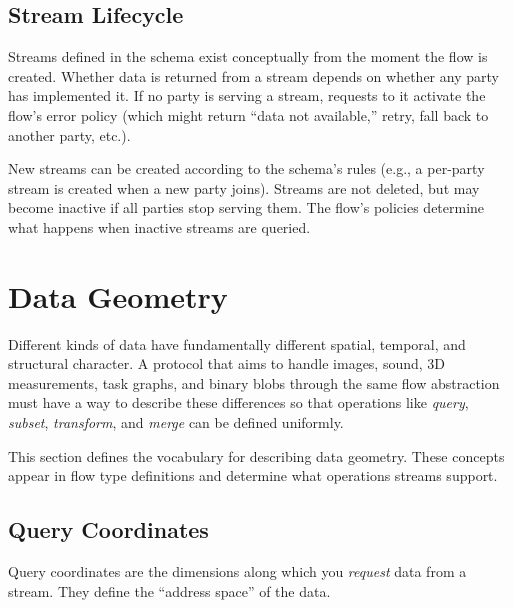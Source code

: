 \documentclass[11pt, letterpaper]{article}
\begin{document}
\subsection{Stream Lifecycle}

Streams defined in the schema exist conceptually from the moment the flow is created.
Whether data is returned from a stream depends on whether any party has implemented it.
If no party is serving a stream, requests to it activate the flow's error policy (which
might return ``data not available,'' retry, fall back to another party, etc.).

New streams can be created according to the schema's rules (e.g., a per-party stream
is created when a new party joins). Streams are not deleted, but may become inactive
if all parties stop serving them. The flow's policies determine what happens when
inactive streams are queried.


\newpage
\section{Data Geometry}
\label{sec:geometry}

Different kinds of data have fundamentally different spatial, temporal, and structural
character. A protocol that aims to handle images, sound, 3D measurements, task graphs,
and binary blobs through the same flow abstraction must have a way to describe these
differences so that operations like \emph{query}, \emph{subset}, \emph{transform}, and
\emph{merge} can be defined uniformly.

This section defines the vocabulary for describing data geometry. These concepts appear
in flow type definitions and determine what operations streams support.

\subsection{Query Coordinates}

Query coordinates are the dimensions along which you \emph{request} data from a stream.
They define the ``address space'' of the data.
\end{document}
